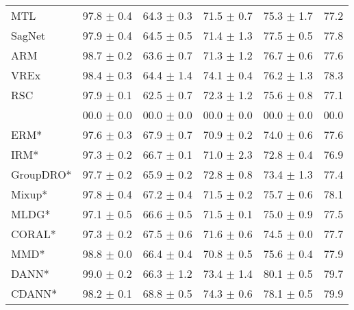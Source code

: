 \begin{table*}
\begin{center}
\begin{tabular}{lccccc}
MTL                  & 97.8 $\pm$ 0.4       & 64.3 $\pm$ 0.3       & 71.5 $\pm$ 0.7       & 75.3 $\pm$ 1.7       & 77.2                 \\
SagNet               & 97.9 $\pm$ 0.4       & 64.5 $\pm$ 0.5       & 71.4 $\pm$ 1.3       & 77.5 $\pm$ 0.5       & 77.8                 \\
ARM                  & 98.7 $\pm$ 0.2       & 63.6 $\pm$ 0.7       & 71.3 $\pm$ 1.2       & 76.7 $\pm$ 0.6       & 77.6                 \\
VREx                 & 98.4 $\pm$ 0.3       & 64.4 $\pm$ 1.4       & 74.1 $\pm$ 0.4       & 76.2 $\pm$ 1.3       & 78.3                 \\
RSC                  & 97.9 $\pm$ 0.1       & 62.5 $\pm$ 0.7       & 72.3 $\pm$ 1.2       & 75.6 $\pm$ 0.8       & 77.1                 \\
\divcams 	   & 00.0 $\pm$ 0.0       & 00.0 $\pm$ 0.0        & 00.0 $\pm$ 0.0       & 00.0 $\pm$ 0.0       & 00.0                \\
\midrule
ERM*                  & 97.6 $\pm$ 0.3       & 67.9 $\pm$ 0.7       & 70.9 $\pm$ 0.2       & 74.0 $\pm$ 0.6       & 77.6                 \\
IRM*                  & 97.3 $\pm$ 0.2       & 66.7 $\pm$ 0.1       & 71.0 $\pm$ 2.3       & 72.8 $\pm$ 0.4       & 76.9                 \\
GroupDRO*             & 97.7 $\pm$ 0.2       & 65.9 $\pm$ 0.2       & 72.8 $\pm$ 0.8       & 73.4 $\pm$ 1.3       & 77.4                 \\
Mixup*                & 97.8 $\pm$ 0.4       & 67.2 $\pm$ 0.4       & 71.5 $\pm$ 0.2       & 75.7 $\pm$ 0.6       & 78.1                 \\
MLDG*                 & 97.1 $\pm$ 0.5       & 66.6 $\pm$ 0.5       & 71.5 $\pm$ 0.1       & 75.0 $\pm$ 0.9       & 77.5                 \\
CORAL*                & 97.3 $\pm$ 0.2       & 67.5 $\pm$ 0.6       & 71.6 $\pm$ 0.6       & 74.5 $\pm$ 0.0       & 77.7                 \\
MMD*                  & 98.8 $\pm$ 0.0       & 66.4 $\pm$ 0.4       & 70.8 $\pm$ 0.5       & 75.6 $\pm$ 0.4       & 77.9                 \\
DANN*                 & 99.0 $\pm$ 0.2       & 66.3 $\pm$ 1.2       & 73.4 $\pm$ 1.4       & 80.1 $\pm$ 0.5       & 79.7                 \\
CDANN*                & 98.2 $\pm$ 0.1       & 68.8 $\pm$ 0.5       & 74.3 $\pm$ 0.6       & 78.1 $\pm$ 0.5       & 79.9                 \\

\end{tabular}
\end{center}
\end{table*}
